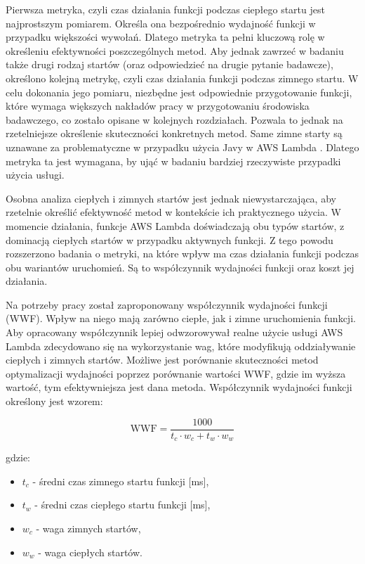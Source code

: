 Pierwsza metryka, czyli czas działania funkcji podczas ciepłego startu jest najprostszym pomiarem.
Określa ona bezpośrednio wydajność funkcji w przypadku większości wywołań.
Dlatego metryka ta pełni kluczową rolę w określeniu efektywności poszczególnych metod.
Aby jednak zawrzeć w badaniu także drugi rodzaj startów (oraz odpowiedzieć na drugie pytanie badawcze), określono kolejną metrykę, czyli czas działania funkcji podczas zimnego startu.
W celu dokonania jego pomiaru, niezbędne jest odpowiednie przygotowanie funkcji, które wymaga większych nakładów pracy w przygotowaniu środowiska badawczego, co zostało opisane w kolejnych rozdziałach.
Pozwala to jednak na rzetelniejsze określenie skuteczności konkretnych metod.
Same zimne starty są uznawane za problematyczne w przypadku użycia Javy w AWS Lambda \cite{9284261}\cite{8605777}.
Dlatego metryka ta jest wymagana, by ująć w badaniu bardziej rzeczywiste przypadki użycia usługi.

Osobna analiza ciepłych i zimnych startów jest jednak niewystarczająca, aby rzetelnie określić efektywność metod w kontekście ich praktycznego użycia.
W momencie działania, funkcje AWS Lambda doświadczają obu typów startów, z dominacją ciepłych startów w przypadku aktywnych funkcji.
Z tego powodu rozszerzono badania o metryki, na które wpływ ma czas działania funkcji podczas obu wariantów uruchomień.
Są to współczynnik wydajności funkcji oraz koszt jej działania.

Na potrzeby pracy został zaproponowany współczynnik wydajności funkcji (WWF). 
Wpływ na niego mają zarówno ciepłe, jak i zimne uruchomienia funkcji.
Aby opracowany współczynnik lepiej odwzorowywał realne użycie usługi AWS Lambda zdecydowano się na wykorzystanie wag, które modyfikują oddziaływanie ciepłych i zimnych startów.
Możliwe jest porównanie skuteczności metod optymalizacji wydajności poprzez porównanie wartości WWF, gdzie im wyższa wartość, tym efektywniejsza jest dana metoda.
Współczynnik wydajności funkcji określony jest wzorem:

\[
\mathrm{WWF} = \frac{1000}{t_c \cdot w_c + t_w \cdot w_w}
\]

gdzie:
\begin{itemize}
  \item \( t_c \) - średni czas zimnego startu funkcji [ms],
  \item \( t_w \) - średni czas ciepłego startu funkcji [ms],
  \item \( w_c \) - waga zimnych startów,
  \item \( w_w \) - waga ciepłych startów.
\end{itemize}

